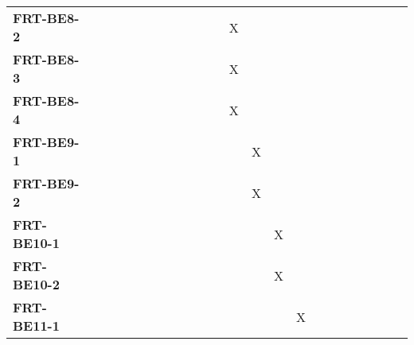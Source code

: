 \documentclass[12pt, titlepage]{article}
\begin{document}
\begin{landscape}
\begin{longtable}{|l|cccccccccccccccc|}
		\textbf{FRT-BE8-2}  & ~                                                         & ~            & ~            & ~            & ~            & ~            & ~            & X            & ~            & ~             & ~             & ~             & ~             & ~             & ~             & ~             \\
		\textbf{FRT-BE8-3}  & ~                                                         & ~            & ~            & ~            & ~            & ~            & ~            & X            & ~            & ~             & ~             & ~             & ~             & ~             & ~             & ~             \\
		\textbf{FRT-BE8-4}  & ~                                                         & ~            & ~            & ~            & ~            & ~            & ~            & X            & ~            & ~             & ~             & ~             & ~             & ~             & ~             & ~             \\
		\textbf{FRT-BE9-1}  & ~                                                         & ~            & ~            & ~            & ~            & ~            & ~            & ~            & X            & ~             & ~             & ~             & ~             & ~             & ~             & ~             \\
		\textbf{FRT-BE9-2}  & ~                                                         & ~            & ~            & ~            & ~            & ~            & ~            & ~            & X            & ~             & ~             & ~             & ~             & ~             & ~             & ~             \\
		\textbf{FRT-BE10-1} & ~                                                         & ~            & ~            & ~            & ~            & ~            & ~            & ~            & ~            & X             & ~             & ~             & ~             & ~             & ~             & ~             \\
		\textbf{FRT-BE10-2} & ~                                                         & ~            & ~            & ~            & ~            & ~            & ~            & ~            & ~            & X             & ~             & ~             & ~             & ~             & ~             & ~             \\
		\textbf{FRT-BE11-1} & ~                                                         & ~            & ~            & ~            & ~            & ~            & ~            & ~            & ~            & ~             & X             & ~             & ~             & ~             & ~             & ~             \\

\end{longtable}
\end{landscape}
\end{document}
